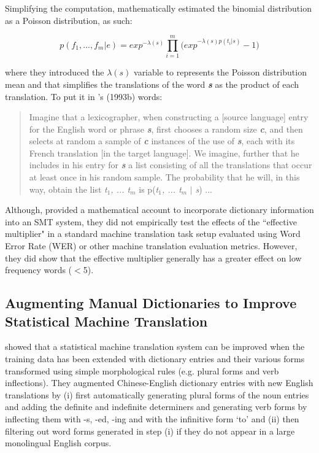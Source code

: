 Simplifying the computation, \cite{brown1993dictionaries} mathematically estimated the binomial distribution as a Poisson distribution, as such:

\begin{equation}
p(f_1, ..., f_m | e) = { exp }^{ -\lambda (s) }\prod _{ i=1 }^{ m }{ { (exp }^{ -\lambda (s)p({ t }_{ i }|s) } } -1)
\end{equation}

where they introduced the $\lambda (s)$ variable to represents the Poisson distribution mean and that simplifies the translations of the word \emph{\textbf{s}} as the product of each translation. To put it in \citeauthor{brown1993dictionaries}'s (1993b) words:

\blockquote{Imagine that a lexicographer, when constructing a [source language] entry for the English word or phrase \emph{\textbf{s}}, first chooses a random size \emph{\textbf{c}}, and then selects at random a sample of \emph{\textbf{c}} instances of the use of \emph{\textbf{s}}, each with its French translation [in the target language]. We imagine, further that he includes in his entry for \emph{\textbf{s}} a list consisting of all the translations that occur at least once in his random sample. The probability that he will, in this way, obtain the list \emph{t${_1}$, ... t${_m}$} is p(\emph{t${_1}$, ... t${_m}$} ${|}$ \emph{s}) ...}

Although, \cite{brown1993dictionaries} provided a mathematical account to incorporate dictionary information into an SMT system, they did not empirically test the effects of the ``effective multiplier" in a standard machine translation task setup evaluated using Word Error Rate (WER) or other machine translation evaluation metrics. However, they did show that the effective multiplier generally has a greater effect on low frequency words (${<}$5). 


\subsection{Augmenting Manual Dictionaries to Improve Statistical Machine Translation}

\cite{Vogel04augmentingmanual} showed that a statistical machine translation system can be improved when the training data has been extended with dictionary entries and their various forms transformed using simple morphological rules (e.g. plural forms and verb inflections). They augmented Chinese-English dictionary entries with new English translations by (i) first automatically generating plural forms of the noun entries and adding the definite and indefinite determiners and generating verb forms by inflecting them with -s, -ed, -ing and  with the infinitive form `to' and (ii) then filtering out word forms generated in step (i) if they do not appear in a large monolingual English corpus.


